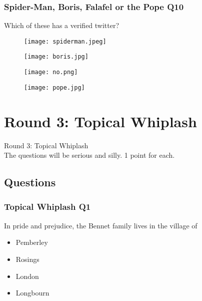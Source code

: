 \documentclass{beamer}
\begin{document}
\begin{frame}
\frametitle{Spider-Man, Boris, Falafel or the Pope Q10}
Which of these has a verified twitter?
\begin{figure}[!htb]
    \centering
    \begin{minipage}{.5\textwidth}
        \centering
        \texttt{[image: spiderman.jpeg]}
        
    \end{minipage}%
    \begin{minipage}{0.5\textwidth}
        \centering
        \texttt{[image: boris.jpg]}
        
    \end{minipage}
\end{figure}
\begin{figure}[!htb]
    \centering
    \begin{minipage}{.5\textwidth}
        \centering
        \texttt{[image: no.png]}
        
    \end{minipage}%
    \begin{minipage}{0.5\textwidth}
        \centering
        \texttt{[image: pope.jpg]}
        
    \end{minipage}
\end{figure}
\end{frame}


\section{Round 3: Topical Whiplash}

\begin{frame}
\centering
\Huge
Round 3: Topical Whiplash\\
\small
The questions will be serious and silly. 1 point for each.
\end{frame}

\subsection{Questions}
\begin{frame}
\frametitle{Topical Whiplash Q1}
In pride and prejudice, the Bennet family lives in the village of
\begin{itemize}
\item Pemberley
\item Rosings
\item London
\item Longbourn
\end{itemize}

\end{frame}
\end{document}
